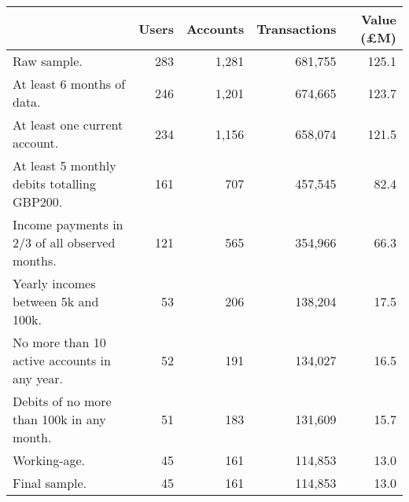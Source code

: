 \begin{tabular}{lrrrr}
\toprule
                                               & Users & Accounts & Transactions & Value (\pounds M) \\
\midrule
                                   Raw sample. &   283 &    1,281 &      681,755 &             125.1 \\
                    At least 6 months of data. &   246 &    1,201 &      674,665 &             123.7 \\
                 At least one current account. &   234 &    1,156 &      658,074 &             121.5 \\
   At least 5 monthly debits totalling GBP200. &   161 &      707 &      457,545 &              82.4 \\
Income payments in 2/3 of all observed months. &   121 &      565 &      354,966 &              66.3 \\
           Yearly incomes between 5k and 100k. &    53 &      206 &      138,204 &              17.5 \\
  No more than 10 active accounts in any year. &    52 &      191 &      134,027 &              16.5 \\
     Debits of no more than 100k in any month. &    51 &      183 &      131,609 &              15.7 \\
                                  Working-age. &    45 &      161 &      114,853 &              13.0 \\
                                 Final sample. &    45 &      161 &      114,853 &              13.0 \\
\bottomrule
\end{tabular}

